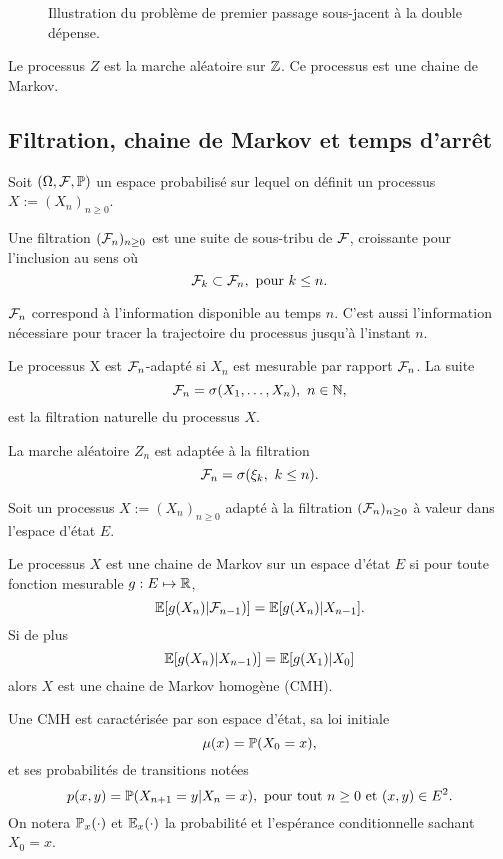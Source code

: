 \begin{figure}[ht!]
\begin{center}
\begin{tikzpicture}
\end{tikzpicture}
\end{center}
\caption{Illustration du problème de premier passage sous-jacent à la double dépense.}
\label{fig:double_spending_time}
\end{figure}

Le processus $Z$ est la marche aléatoire sur $\Z$. Ce processus est une chaine de Markov.
\subsection{Filtration, chaine de Markov et temps d'arrêt}
Soit $(\Omega,\F, \Prob)$ un espace probabilisé sur lequel on définit un processus $X:=(X_n)_{n\geq0}$. 
\begin{definition}\label{def:filtration}
Une filtration $(\F_n)_{n\geq0}$ est une suite de sous-tribu de $\F$, croissante pour l'inclusion au sens où
$$
\F_k\subset \F_n,\text{ pour }k\leq n.
$$

\end{definition}
$\F_n$ correspond à l'information disponible au temps $n$. C'est aussi l'information nécessiare pour tracer la trajectoire du processus jusqu'à l'instant $n$.
\begin{definition}\label{def:processus_adapte}
Le processus X est $\F_n$-adapté si $X_n$ est mesurable par rapport $\F_n$. La suite
$$
\F_n = \sigma(X_1,\ldots, X_n),\text{ }n\in \N,
$$ 
est la filtration naturelle du processus $X$.
\end{definition}
\begin{ex}\label{ex:filtration_marche_aleatoire}
La marche aléatoire $Z_n$ est adaptée à la filtration $$
\F_n = \sigma(\xi_k,\text{ }k\leq n).
$$
\end{ex}
Soit un processus $X:=(X_n)_{n\geq0}$ adapté à la filtration $(\F_n)_{n\geq0}$ à valeur dans l'espace d'état $E$.
\begin{definition}\label{def:CM}
Le processus $X$ est une chaine de Markov sur un espace d'état $E$ si pour toute fonction mesurable $g:E\mapsto \RL$,
$$
\E[g(X_n)|\F_{n-1})] = \E[g(X_n)|X_{n-1}].
$$
Si de plus 
$$
\E[g(X_n)|X_{n-1})] = \E[g(X_1)|X_0]
$$
alors $X$ est une chaine de Markov homogène (CMH).
\end{definition}
Une CMH est caractérisée par son espace d'état, sa loi initiale 
$$
\mu(x) = \Prob(X_0 = x),
$$
et ses probabilités de transitions notées
$$
p(x,y) = \Prob(X_{n+1} = y|X_{n}= x),\text{ pour tout }n\geq0\text{ et }(x,y)\in E^2.
$$
On notera $\Prob_x(\cdot)$ et $\E_x(\cdot)$ la probabilité et l'espérance conditionnelle sachant $X_0 = x$. 

